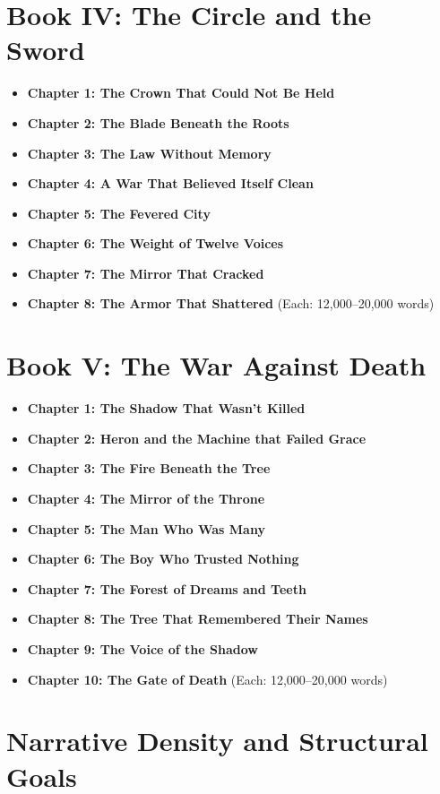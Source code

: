 \documentclass[9pt]{article}
\begin{document}
\section*{Book IV: The Circle and the Sword}
\begin{itemize}
  \item \textbf{Chapter 1: The Crown That Could Not Be Held}
  \item \textbf{Chapter 2: The Blade Beneath the Roots}
  \item \textbf{Chapter 3: The Law Without Memory}
  \item \textbf{Chapter 4: A War That Believed Itself Clean}
  \item \textbf{Chapter 5: The Fevered City}
  \item \textbf{Chapter 6: The Weight of Twelve Voices}
  \item \textbf{Chapter 7: The Mirror That Cracked}
  \item \textbf{Chapter 8: The Armor That Shattered}
  \hfill (Each: 12,000–20,000 words)
\end{itemize}

\section*{Book V: The War Against Death}
\begin{itemize}
  \item \textbf{Chapter 1: The Shadow That Wasn’t Killed}
  \item \textbf{Chapter 2: Heron and the Machine that Failed Grace}
  \item \textbf{Chapter 3: The Fire Beneath the Tree}
  \item \textbf{Chapter 4: The Mirror of the Throne}
  \item \textbf{Chapter 5: The Man Who Was Many}
  \item \textbf{Chapter 6: The Boy Who Trusted Nothing}
  \item \textbf{Chapter 7: The Forest of Dreams and Teeth}
  \item \textbf{Chapter 8: The Tree That Remembered Their Names}
  \item \textbf{Chapter 9: The Voice of the Shadow}
  \item \textbf{Chapter 10: The Gate of Death}
  \hfill (Each: 12,000–20,000 words)
\end{itemize}

\section*{Narrative Density and Structural Goals}
\end{document}
